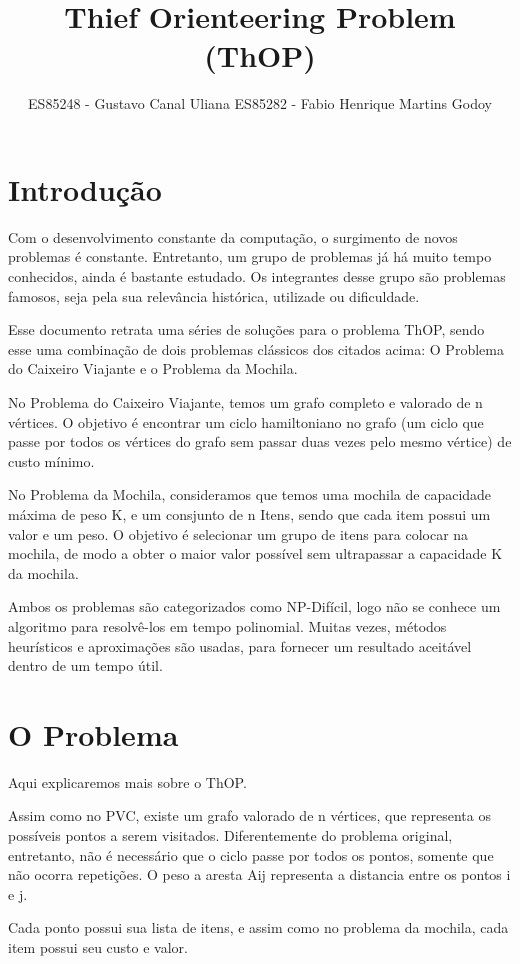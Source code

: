 \documentclass[12pt,14paper,onecolumn]{article}
\author{ES85248 - Gustavo Canal Uliana
ES85282 - Fabio Henrique Martins Godoy}
\title{Thief Orienteering Problem (ThOP)}
\begin{document}
\setlength{\parindent}{5ex}
\maketitle

\section{Introdução}
Com o desenvolvimento constante da computação, o surgimento de novos problemas é constante. Entretanto, um grupo de problemas já há muito tempo conhecidos, ainda é bastante estudado.
Os integrantes desse grupo são problemas famosos, seja pela sua relevância histórica, utilizade ou dificuldade.

Esse documento retrata uma séries de soluções para o problema ThOP, sendo esse uma combinação de dois problemas clássicos dos citados acima: O Problema do Caixeiro Viajante e o Problema da Mochila.

No Problema do Caixeiro Viajante, temos um grafo completo e valorado de n vértices. O objetivo é encontrar um ciclo hamiltoniano no grafo (um ciclo que passe por todos os vértices do grafo sem passar duas vezes pelo mesmo vértice) de custo mínimo.

No Problema da Mochila, consideramos que temos uma mochila de capacidade máxima de peso K, e um consjunto de n Itens, sendo que cada item possui um valor e um peso. O objetivo é selecionar um grupo de itens para colocar na mochila, de modo a obter o maior valor possível sem ultrapassar a capacidade K da mochila.

Ambos os problemas são categorizados como NP-Difícil, logo não se conhece um algoritmo para resolvê-los em tempo polinomial. Muitas vezes, métodos heurísticos e aproximações são usadas, para fornecer um resultado aceitável dentro de um tempo útil.


\section{O Problema}
Aqui explicaremos mais sobre o ThOP.

Assim como no PVC, existe um grafo valorado de n vértices, que representa os possíveis pontos a serem visitados. Diferentemente do problema original, entretanto, não é necessário que o ciclo passe por todos os pontos, somente que não ocorra repetições.
O peso a aresta Aij representa a distancia entre os pontos i e j.

Cada ponto possui sua lista de itens, e assim como no problema da mochila, cada item possui seu custo e valor.
\end{document}
